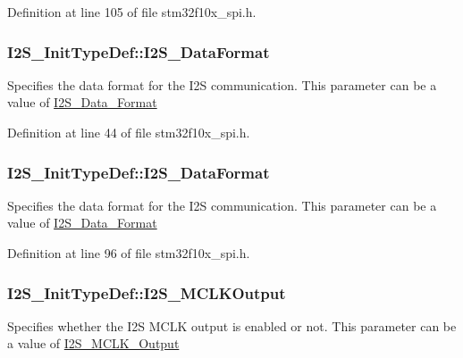 Definition at line 105 of file stm32f10x\+\_\+spi.\+h.

\subsubsection[{\texorpdfstring{I2\+S\+\_\+\+Data\+Format}{I2S_DataFormat}}]{ I2\+S\+\_\+\+Init\+Type\+Def\+::\+I2\+S\+\_\+\+Data\+Format}\hypertarget{struct_i2_s___init_type_def_a54330aab69acdb50db8607c1d1e4738d}{}\label{struct_i2_s___init_type_def_a54330aab69acdb50db8607c1d1e4738d}
Specifies the data format for the I2S communication. This parameter can be a value of \hyperlink{group___i2_s___data___format}{I2\+S\+\_\+\+Data\+\_\+\+Format} 

Definition at line 44 of file stm32f10x\+\_\+spi.\+h.

\subsubsection[{\texorpdfstring{I2\+S\+\_\+\+Data\+Format}{I2S_DataFormat}}]{ I2\+S\+\_\+\+Init\+Type\+Def\+::\+I2\+S\+\_\+\+Data\+Format}\hypertarget{struct_i2_s___init_type_def_ad5e59034081427fd638983c10f18e833}{}\label{struct_i2_s___init_type_def_ad5e59034081427fd638983c10f18e833}
Specifies the data format for the I2S communication. This parameter can be a value of \hyperlink{group___i2_s___data___format}{I2\+S\+\_\+\+Data\+\_\+\+Format} 

Definition at line 96 of file stm32f10x\+\_\+spi.\+h.

\subsubsection[{\texorpdfstring{I2\+S\+\_\+\+M\+C\+L\+K\+Output}{I2S_MCLKOutput}}]{ I2\+S\+\_\+\+Init\+Type\+Def\+::\+I2\+S\+\_\+\+M\+C\+L\+K\+Output}\hypertarget{struct_i2_s___init_type_def_a58b89fa9268a9cfd443d3ab9dd638934}{}\label{struct_i2_s___init_type_def_a58b89fa9268a9cfd443d3ab9dd638934}
Specifies whether the I2S M\+C\+LK output is enabled or not. This parameter can be a value of \hyperlink{group___i2_s___m_c_l_k___output}{I2\+S\+\_\+\+M\+C\+L\+K\+\_\+\+Output} 

